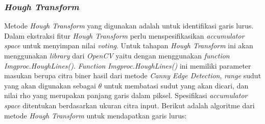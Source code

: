 \subsubsection{\textit{Hough Transform}}
\noindent Metode \textit{Hough Transform} yang digunakan adalah untuk identifikasi garis lurus. Dalam ekstraksi fitur \textit{Hough Transform} perlu menspesifikasikan \textit{accumulator space} untuk menyimpan nilai \textit{voting}. Untuk tahapan \textit{Hough Transform} ini akan menggunakan \textit{library} dari \textit{OpenCV} yaitu dengan menggunakan \textit{function} \textit{Imgproc.HoughLines()}. \textit{Function} \textit{Imgproc.HoughLines()} ini memiliki parameter masukan berupa citra biner hasil dari metode \textit{Canny Edge Detection}, \textit{range} sudut yang akan digunakan sebagai $\theta$ untuk membatasi sudut yang akan dicari, dan  nilai rho yang merupakan panjang garis dalam piksel. Spesifikasi \textit{accumulator space} ditentukan berdasarkan ukuran citra input. Berikut adalah algoritme dari metode \textit{Hough Transform} untuk mendapatkan garis lurus:
